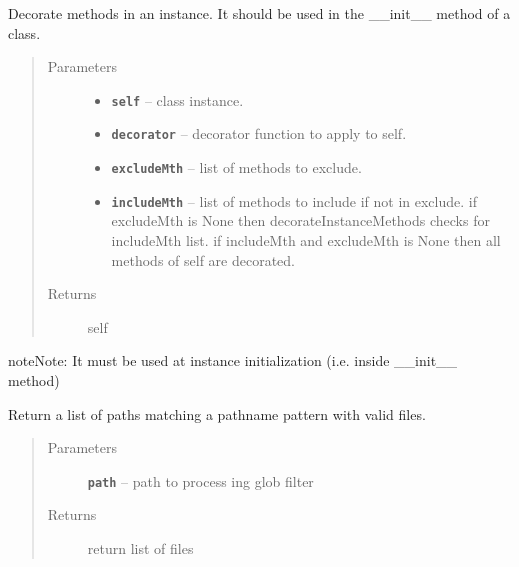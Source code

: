 \documentclass[letterpaper,10pt,english]{sphinxmanual}
\begin{document}
\begin{fulllineitems}
\label{RRtoolbox.lib:RRtoolbox.lib.root.decorateInstanceMethods}
Decorate methods in an instance. It should be used in the \_\_init\_\_ method of a class.
\begin{quote}\begin{description}
\item[{Parameters}] \leavevmode\begin{itemize}
\item {} 
\textbf{\texttt{self}} -- class instance.

\item {} 
\textbf{\texttt{decorator}} -- decorator function to apply to self.

\item {} 
\textbf{\texttt{excludeMth}} -- list of methods to exclude.

\item {} 
\textbf{\texttt{includeMth}} -- list of methods to include if not in exclude.
if excludeMth is None then decorateInstanceMethods checks for includeMth list.
if includeMth and excludeMth is None then all methods of self are decorated.

\end{itemize}

\item[{Returns}] \leavevmode
self

\end{description}\end{quote}

\begin{notice}{note}{Note:}
It must be used at instance initialization (i.e. inside \_\_init\_\_ method)
\end{notice}

\end{fulllineitems}


\begin{fulllineitems}
\label{RRtoolbox.lib:RRtoolbox.lib.root.glob}
Return a list of paths matching a pathname pattern with valid files.
\begin{quote}\begin{description}
\item[{Parameters}] \leavevmode
\textbf{\texttt{path}} -- path to process ing glob filter

\item[{Returns}] \leavevmode
return list of files

\end{description}\end{quote}

\end{fulllineitems}
\end{document}
